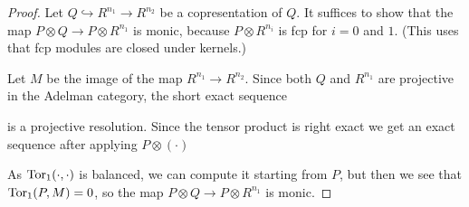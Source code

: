 \begin{proof}
  Let $Q \hookrightarrow R^{n_1} \rightarrow R^{n_2}$ be a copresentation of $Q$.
  It suffices to show that the map $P \otimes Q \rightarrow P \otimes R^{n_1}$ is monic, because $P \otimes R^{n_i}$ is fcp for $i = 0$ and $1$.
  (This uses that fcp modules are closed under kernels.)

  Let $M$ be the image of the map $R^{n_1} \rightarrow R^{n_2}$.
  Since both $Q$ and $R^{n_1}$ are projective in the Adelman category, the short exact sequence
  \begin{center}
  \end{center}
  is a projective resolution.
  Since the tensor product is right exact we get an exact sequence after applying $P \otimes (\cdot)$
  \begin{center}
  \end{center}
  As $\textup{Tor}_1(\cdot, \cdot)$ is balanced, we can compute it starting from $P$, but then we see that $\textup{Tor}_1(P,M) = 0$, so the map $P \otimes Q \rightarrow P \otimes R^{n_1}$ is monic.
\end{proof}

